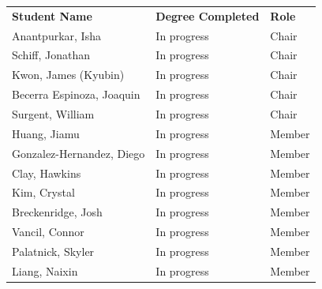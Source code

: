 \documentclass{article}
\newlength{\cvindent}
\newlength{\cvtablewidth}
\newcommand{\cvtableindent}{\noindent\hspace*{\cvindent}}
\begin{document}

\setlength{\tabcolsep}{6pt}
\renewcommand{\arraystretch}{1.05}

\cvtableindent\begin{tabularx}{\cvtablewidth}{|X X X|}
\hline
\rowcolor{gray!25}
\textbf{Student Name} & \textbf{Degree Completed} & \textbf{Role} \\
Anantpurkar, Isha & In progress & Chair \\
Schiff, Jonathan & In progress & Chair \\
Kwon, James (Kyubin) & In progress & Chair \\
Becerra Espinoza, Joaquin & In progress & Chair \\
Surgent, William & In progress & Chair \\
Huang, Jiamu & In progress & Member \\
Gonzalez-Hernandez, Diego & In progress & Member \\
Clay, Hawkins & In progress & Member \\
Kim, Crystal & In progress & Member \\
Breckenridge, Josh & In progress & Member \\
Vancil, Connor & In progress & Member \\
Palatnick, Skyler & In progress & Member \\
Liang, Naixin & In progress & Member \\
\hline
\end{tabularx}
\end{document}
